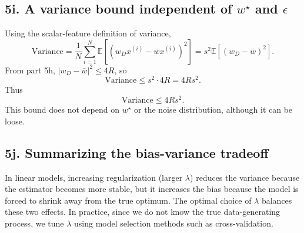 \documentclass[11pt]{article}
\begin{document}
\subsection*{5i. A variance bound independent of $w^\star$ and $\epsilon$}

Using the scalar-feature definition of variance,
\[
\text{Variance} = \frac1N\sum_{i=1}^N \mathbb{E}[(w_Dx^{(i)}-\bar w x^{(i)})^2]
= s^2\mathbb{E}[(w_D-\bar w)^2].
\]
From part 5h, $|w_D-\bar w|^2\le 4R$, so
\[
\text{Variance}\le s^2\cdot 4R = 4Rs^2.
\]
Thus
\[
\boxed{\text{Variance}\le 4Rs^2.}
\]
This bound does not depend on $w^\star$ or the noise distribution, although it can be loose.

\subsection*{5j. Summarizing the bias-variance tradeoff}

In linear models, increasing regularization (larger $\lambda$) reduces the variance because the estimator becomes more stable, but it increases the bias because the model is forced to shrink away from the true optimum. The optimal choice of $\lambda$ balances these two effects. In practice, since we do not know the true data-generating process, we tune $\lambda$ using model selection methods such as cross-validation.
\end{document}

